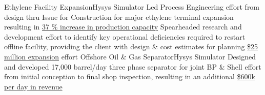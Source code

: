 %
%
%
%
%
\justifiedsubsection%
%
{Ethylene Facility Expansion}{Hysys Simulator}
%
\workitemsTwo%
%
{Led Process Engineering effort from design thru Issue for Construction for major ethylene terminal expansion resulting in \underline{37 \% increase in production capacity}}
{Spearheaded research and development effort to identify key operational deficiencies required to restart offline facility, providing the client with design \& cost estimates for planning \underline{\$25 million expansion} effort}
%
%
%
%
\justifiedsubsection%
%
{Offshore Oil \& Gas Separator}{Hysys Simulator}
%
\workitemsOne%
%
{Designed and developed 17,000 barrel/day three phase separator for joint BP \& Shell effort from initial conception to final shop inspection, resulting in an additional \underline{\$600k per day in revenue}}
%
%
%
%